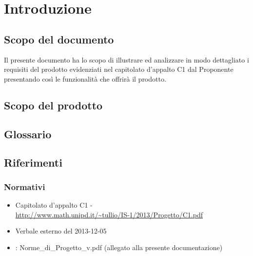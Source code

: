 \newpage
\tableofcontents

\newpage
\listoftables
\listoffigures

\newpage
\section{Introduzione}%
\subsection{Scopo del documento}%
Il presente documento ha lo scopo di illustrare ed analizzare in modo dettagliato i requisiti del prodotto  evidenziati nel capitolato d'appalto C1 dal Proponente \Prop{} presentando così le funzionalità che offrirà il prodotto.

\subsection{Scopo del prodotto} %
\Prodotto{}
\subsection{Glossario}%
\Glossario{}

\subsection{Riferimenti} %
\subsubsection{Normativi} %


\begin{itemize}
\item Capitolato d'appalto C1 - \Progetto{} \\
\url{http://www.math.unipd.it/~tullio/IS-1/2013/Progetto/C1.pdf}
\item Verbale esterno del 2013-12-05
\item {}: Norme\_{}di\_{}Progetto\_{}v\versioneNormeDiProgetto{}.pdf  (allegato alla presente documentazione)\\
\end{itemize}

